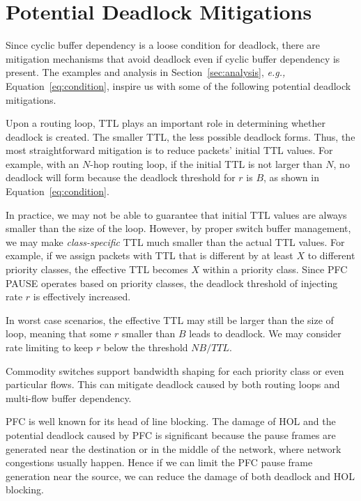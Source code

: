\section{Potential Deadlock Mitigations}
\label{sec:mitigation}

Since cyclic buffer dependency is a loose condition for deadlock, there are
mitigation mechanisms that avoid deadlock even if cyclic buffer dependency is present.
The examples and analysis in Section~\ref{sec:analysis}, {\em e.g.,} Equation~\ref{eq:condition},
inspire us with some of the following potential deadlock mitigations.


 Upon a routing loop, TTL plays an important role in
determining whether deadlock is created. The smaller TTL, the less possible deadlock forms.
Thus, the most straightforward mitigation is to reduce packets' initial TTL values.
For example, with an $N$-hop routing loop, if the initial TTL is not larger than $N$,
no deadlock will form because the deadlock threshold for $r$ is $B$, as shown in
Equation~\ref{eq:condition}.

In practice, we may not be able to guarantee that initial TTL values are always smaller than
the size of the loop. However, by proper switch buffer management, we may make {\em class-specific}
TTL much smaller than the actual TTL values. For example, if we assign packets with TTL that
is different by at least $X$ to different priority classes, the effective TTL becomes $X$
within a priority class. Since PFC PAUSE operates based on priority classes, the deadlock threshold
of injecting rate $r$ is effectively increased.

In worst case scenarios, the effective TTL may still be larger than the size of loop, meaning
that some $r$ smaller than $B$ leads to deadlock. We may consider rate limiting to keep
$r$ below the threshold $NB/TTL$.

 Commodity switches support bandwidth shaping for each priority class
or even particular flows. This can mitigate deadlock caused by both routing loops and multi-flow
buffer dependency. 


PFC is well known for its head of line blocking. The damage of HOL and the potential deadlock caused by PFC is significant because the pause frames are generated near the destination or in the middle of the network, where network congestions usually happen. Hence if we can limit the PFC pause frame generation near the source, we can reduce the damage of both deadlock and HOL blocking. 

